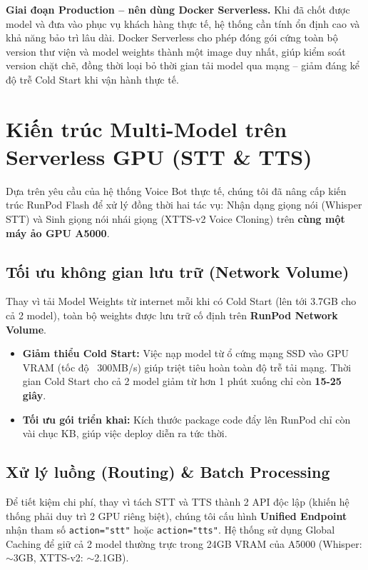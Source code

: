 \documentclass[12pt,a4paper]{article}
\begin{document}
\textbf{Giai đoạn Production -- nên dùng Docker Serverless.} Khi đã chốt được model và đưa vào phục vụ khách hàng thực tế, hệ thống cần tính ổn định cao và khả năng bảo trì lâu dài. Docker Serverless cho phép đóng gói cứng toàn bộ version thư viện và model weights thành một image duy nhất, giúp kiểm soát version chặt chẽ, đồng thời loại bỏ thời gian tải model qua mạng -- giảm đáng kể độ trễ Cold Start khi vận hành thực tế.

\section{Kiến trúc Multi-Model trên Serverless GPU (STT \& TTS)}

Dựa trên yêu cầu của hệ thống Voice Bot thực tế, chúng tôi đã nâng cấp kiến trúc RunPod Flash để xử lý đồng thời hai tác vụ: Nhận dạng giọng nói (Whisper STT) và Sinh giọng nói nhái giọng (XTTS-v2 Voice Cloning) trên \textbf{cùng một máy ảo GPU A5000}.

\subsection{Tối ưu không gian lưu trữ (Network Volume)}

Thay vì tải Model Weights từ internet mỗi khi có Cold Start (lên tới 3.7GB cho cả 2 model), toàn bộ weights được lưu trữ cố định trên \textbf{RunPod Network Volume}.
\begin{itemize}[noitemsep]
    \item \textbf{Giảm thiểu Cold Start:} Việc nạp model từ ổ cứng mạng SSD vào GPU VRAM (tốc độ ~300MB/s) giúp triệt tiêu hoàn toàn độ trễ tải mạng. Thời gian Cold Start cho cả 2 model giảm từ hơn 1 phút xuống chỉ còn \textbf{15-25 giây}.
    \item \textbf{Tối ưu gói triển khai:} Kích thước package code đẩy lên RunPod chỉ còn vài chục KB, giúp việc deploy diễn ra tức thời.
\end{itemize}

\subsection{Xử lý luồng (Routing) \& Batch Processing}

Để tiết kiệm chi phí, thay vì tách STT và TTS thành 2 API độc lập (khiến hệ thống phải duy trì 2 GPU riêng biệt), chúng tôi cấu hình \textbf{Unified Endpoint} nhận tham số \texttt{action="stt"} hoặc \texttt{action="tts"}. Hệ thống sử dụng Global Caching để giữ cả 2 model thường trực trong 24GB VRAM của A5000 (Whisper: $\sim$3GB, XTTS-v2: $\sim$2.1GB).
\end{document}
